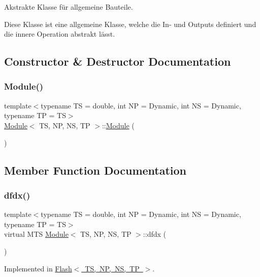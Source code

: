 Akstrakte Klasse für allgemeine Bauteile. 

Diese Klasse ist eine allgemeine Klasse, welche die In-\/ und Outputs definiert und die innere Operation abstrakt lässt. 

\subsection{Constructor \& Destructor Documentation}
\mbox{\label{class_module_a40ec09f0f85314f2b542077d83567d7a}} 
\subsubsection{\texorpdfstring{Module()}{Module()}}
{\footnotesize\ttfamily template$<$typename TS = double, int NP = Dynamic, int NS = Dynamic, typename TP = TS$>$ \\
\mbox{\hyperlink{class_module}{Module}}$<$ TS, NP, NS, TP $>$\+::\mbox{\hyperlink{class_module}{Module}} (\begin{DoxyParamCaption}{ }\end{DoxyParamCaption})\hspace{0.3cm}{\ttfamily [inline]}}



\subsection{Member Function Documentation}
\mbox{\label{class_module_a0762d7cbad2a73d5eff3f2f1155e8e33}} 
\subsubsection{\texorpdfstring{dfdx()}{dfdx()}}
{\footnotesize\ttfamily template$<$typename TS = double, int NP = Dynamic, int NS = Dynamic, typename TP = TS$>$ \\
virtual M\+TS \mbox{\hyperlink{class_module}{Module}}$<$ TS, NP, NS, TP $>$\+::dfdx (\begin{DoxyParamCaption}{ }\end{DoxyParamCaption})\hspace{0.3cm}{\ttfamily [pure virtual]}}



Implemented in \mbox{\hyperlink{class_flash_a83e35b3ab13b3705f0fe06c40b800a8b}{Flash$<$ T\+S, N\+P, N\+S, T\+P $>$}}.


